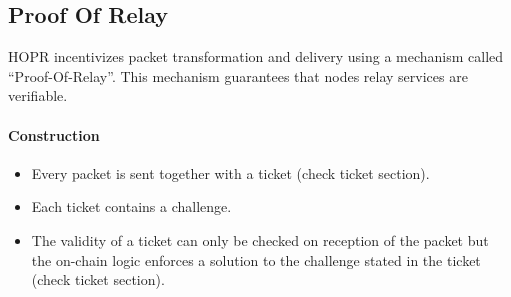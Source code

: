 \subsection{Proof Of Relay}

HOPR incentivizes packet transformation and delivery using a mechanism called “Proof-Of-Relay”.
This mechanism guarantees that nodes relay services are verifiable.
\paragraph{Construction}
\begin{itemize}
    \item Every packet is sent together with a ticket (check ticket section).
    \item Each ticket contains a challenge.
    \item The validity of a ticket can only be checked on reception of the packet but the on-chain logic enforces a solution to the challenge stated in the ticket (check ticket section).
\end{itemize}

